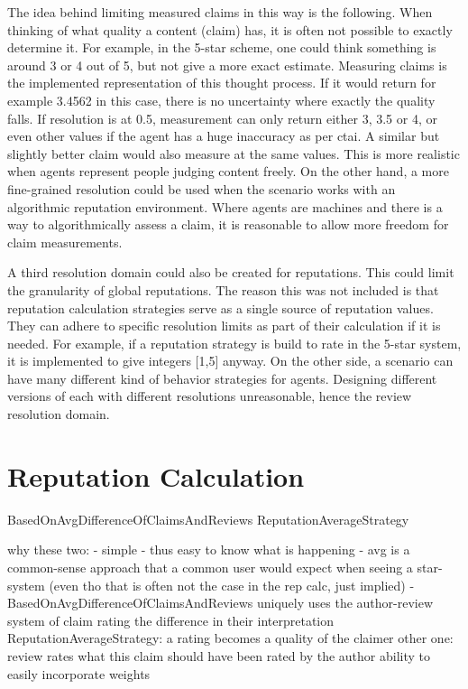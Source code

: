 \documentclass[%
    ]{\PathToTumTemplate/thesis/tum_thesis}
\begin{document}
The idea behind limiting measured claims in this way is the following.
When thinking of what quality a content (claim) has, it is often not possible to exactly determine it.
For example, in the 5-star scheme, one could think something is around 3 or 4 out of 5, but not give a more exact estimate.
Measuring claims is the implemented representation of this thought process.
If it would return for example 3.4562 in this case, there is no uncertainty where exactly the quality falls.
If resolution is at 0.5, measurement can only return either 3, 3.5 or 4, or even other values if the agent has a huge inaccuracy as per \gls{ctai}.
A similar but slightly better claim would also measure at the same values.
This is more realistic when agents represent people judging content freely.
On the other hand, a more fine-grained resolution could be used when the scenario works with an algorithmic reputation environment.
Where agents are machines and there is a way to algorithmically assess a claim, it is reasonable to allow more freedom for claim measurements.

A third resolution domain could also be created for reputations.
This could limit the granularity of global reputations.
The reason this was not included is that reputation calculation strategies serve as a single source of reputation values.
They can adhere to specific resolution limits as part of their calculation if it is needed.
For example, if a reputation strategy is build to rate in the 5-star system, it is implemented to give integers [1,5] anyway.
On the other side, a scenario can have many different kind of behavior strategies for agents.
Designing different versions of each with different resolutions unreasonable, hence the review resolution domain.


\section{Reputation Calculation}\label{sec:approach_reputation_calculation}
BasedOnAvgDifferenceOfClaimsAndReviews
ReputationAverageStrategy

why these two:
	- simple
	- thus easy to know what is happening
	- avg is a common-sense approach that a common user would expect when seeing a star-system
	(even tho that is often not the case in the rep calc, just implied)
	- BasedOnAvgDifferenceOfClaimsAndReviews uniquely uses the author-review system of claim rating
the difference in their interpretation
	ReputationAverageStrategy: a rating becomes a quality of the claimer
	other one: review rates what this claim should have been rated by the author
ability to easily incorporate weights
\end{document}
